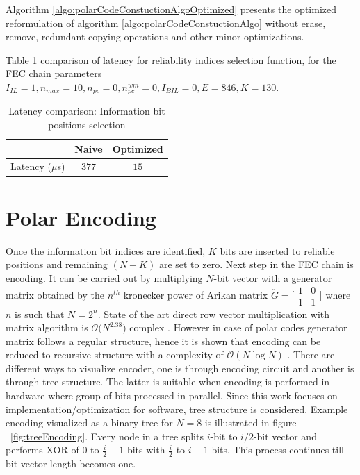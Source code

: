 Algorithm \ref{algo:polarCodeConstuctionAlgoOptimized} presents the optimized reformulation of algorithm \ref{algo:polarCodeConstuctionAlgo} without erase, remove, redundant copying operations and other minor optimizations.

Table \ref{tab:codeConstrLatency} comparison of latency for reliability indices selection function, for the FEC chain parameters $I_{IL} = 1, n_{max} = 10, n_{pc} = 0 ,n_{pc}^{wm} = 0, I_{BIL} = 0, E = 846, K = 130$. 
\begin{table}[!h]
	\begin{center}
		\caption{Latency comparison: Information bit positions selection}
		\label{tab:codeConstrLatency}
		\begin{tabular}{c|c|c} %
			\textbf{ } & Naive & Optimized \\
			\hline
			Latency ($\mu$s) & $377$ & $15$\\
		\end{tabular}
	\end{center}
\end{table}

\section{Polar Encoding}
Once the information bit indices are identified, $K$ bits are inserted to reliable positions and remaining  $(N-K)$ are set to zero. Next step in the FEC chain is encoding. It can be carried out by multiplying $N$-bit vector with a generator matrix obtained by the $n^{th}$ kronecker power of Arikan matrix $\utilde{G} = \big[\begin{smallmatrix} 1 & 0 \\ 1 & 1 \end{smallmatrix}$\big]  where $n$ is such that $N = 2^{n}$. State of the art direct row vector multiplication with matrix algorithm is $\mathcal{O}\big(N^{2.38}\big)$ complex \cite{MatrixMultComplexity}. However in case of polar codes generator matrix follows a regular structure, hence it is shown that encoding can be reduced to recursive structure with a complexity of $\mathcal{O}(N\log{}N)$ \cite{Arikan}. There are different ways to visualize encoder, one is through encoding circuit and another is through tree structure. The latter is suitable when encoding is performed in hardware where group of bits processed in parallel. Since this work focuses on implementation/optimization for software, tree structure is considered. Example encoding visualized as a binary tree for $N = 8$ is illustrated in figure ~\ref{fig:treeEncoding}. Every node in a tree splits $i$-bit to $i/2$-bit vector and performs XOR of $0$ to $\frac{i}{2}-1$ bits with $\frac{i}{2}$ to $i-1$ bits. This process continues till bit vector length becomes one.

